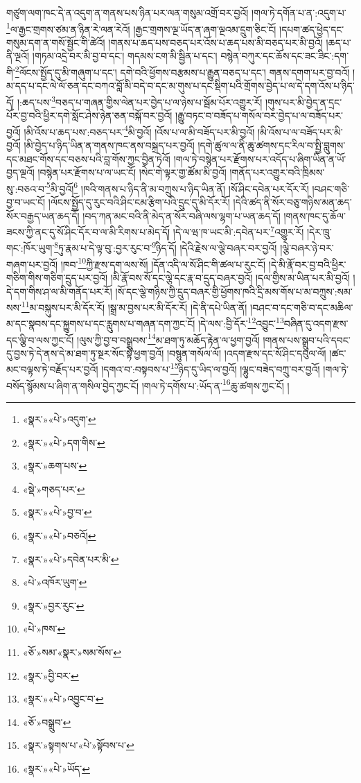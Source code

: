 གཙུག་ལག་ཁང་དེ་ན་འདུག་ན་གནས་པས་ཉིན་པར་ལན་གསུམ་འགྲོ་བར་བྱའོ། །གལ་ཏེ་དགོན་པ་ན་:འདུག་པ་\footnote{«སྣར་»«པེ་»འདུག་}ལ་རྒྱང་གྲགས་ཙམ་ན་ཉིན་རེ་ལན་རེའོ། །རྒྱང་གྲགས་ལྔ་ཡོད་ན་ཞག་ལྔའམ་དྲུག་ཅིང་ངོ། །དཔག་ཚད་ཕྱེད་དང་གསུམ་དག་ན་གསོ་སྦྱོང་གི་ཚེའོ། །གནས་པ་ཆད་པས་བཅད་པར་འོས་པ་ཆད་པས་མི་བཅད་པར་མི་བྱའོ། །ཆད་པ་ནི་ལྔའོ། །གཏམ་འདྲེ་བར་མི་བྱ་བ་དང་། གདམས་ངག་མི་སྦྱིན་པ་དང་། བསྙེན་བཀུར་དང་ཆོས་དང་ཟང་ཟིང་:དག་གི་\footnote{«སྣར་»«པེ་»དག་གིས་}ལོངས་སྤྱོད་དུ་མི་གཞུག་པ་དང་། དགེ་བའི་ཕྱོགས་བརྩམས་པ་རྒྱུན་བཅད་པ་དང་། གནས་དགག་པར་བྱ་བའོ། །མ་དད་པ་དང་ལེ་ལོ་ཅན་དང་བཀའ་བློ་མི་བདེ་བ་དང་མ་གུས་པ་དང་སྡིག་པའི་གྲོགས་བྱེད་པ་ལ་དེ་དག་འོས་པ་ཉིད་དོ། །:ཆད་པས་\footnote{«སྣར་»ཆག་པས་}བཅད་པ་གཞན་གྱིས་ལེན་པར་བྱེད་པ་ལ་ཉེས་པ་སྦོམ་པོར་འགྱུར་རོ། །གུས་པར་མི་བྱེད་ན་དྲང་པོར་བྱ་བའི་ཕྱིར་དགེ་སློང་ཤེས་ཉེན་ཅན་བསྐོ་བར་བྱའོ། །རྒྱུ་བཏང་བ་བཟོད་པ་གསོལ་བར་བྱེད་པ་ལ་བཟོད་པར་བྱའོ། །མི་འོས་པ་ཆད་པས་:བཅད་པར་\footnote{«སྡེ་»གཅད་པར་}མི་བྱའོ། །འོས་པ་ལ་མི་བཟོད་པར་མི་བྱའོ། །མི་འོས་པ་ལ་བཟོད་པར་མི་བྱའོ། །མི་བྱེད་པ་ཉིད་ཡིན་ན་གནས་ཁང་ནས་བསྐྲད་པར་བྱའོ། །དགེ་ཚུལ་ལ་ནི་ཆུ་ཚགས་དང་རིལ་བ་སྤྱི་བླུགས་དང་མཐང་གོས་དང་བཅས་པའི་བླ་གོས་ཀྱང་བྱིན་ཏེའོ། །གལ་ཏེ་བསྙེན་པར་རྫོགས་པར་འདོད་པ་ཞིག་ཡིན་ན་ཡོ་བྱད་ལྔའོ། །བསྙེན་པར་རྫོགས་པ་ལ་ཡང་ངོ། །སེང་གེ་ལྟར་གྱ་ཚོམ་མི་བྱའོ། །གནོད་པར་འགྱུར་བའི་ཁྲིམས་སུ་:བཅའ་བ་\footnote{«སྣར་»«པེ་»བྱ་བ་}མི་བྱའོ།\footnote{«སྣར་»«པེ་»བཅའོ།} །ཁའི་གནས་པ་ཉིད་ནི་མ་བཀྲུས་པ་ཉིད་ཡིན་ནོ། །སོ་ཤིང་དབེན་པར་དོར་རོ། །བཤང་གཅི་བྱ་བ་ཡང་ངོ། །ལོངས་སྤྱོད་དུ་རུང་བའི་ཤིང་ངམ་རྩིག་པའི་དྲུང་དུ་མི་དོར་རོ། །དེའི་ཚད་ནི་སོར་བཅུ་གཉིས་མན་ཆད་སོར་བརྒྱད་ཡན་ཆད་དོ། །བད་ཀན་མང་བའི་ནི་མེད་ན་སོར་བཞི་ལས་ལྷག་པ་ཡན་ཆད་དོ། །གནས་ཁང་དུ་ཆོལ་ཟངས་ཀྱི་ནང་དུ་སོ་ཤིང་དོར་བ་ལ་མི་རིགས་པ་མེད་དོ། །དེ་ལ་ཝ་ཁ་ཡང་མི་:དབེན་པར་\footnote{«སྣར་»«པེ་»དབེན་པར་མི་}འགྱུར་རོ། །དེར་ཁྲུ་གང་:ཁོར་ཡུག་\footnote{«པེ་»འཁོར་ཡུག་}ཏུ་རྣམ་པ་དེ་ལྟ་བུ་:བྱར་རུང་བ་\footnote{«སྣར་»བྱར་རུང་}ཉིད་དོ། །དེའི་རྗེས་ལ་ལྕེ་བཞར་བར་བྱའོ། །ལྕེ་བཞར་ཉེ་བར་གཞག་པར་བྱའོ། །ཁབ་\footnote{«པེ་»ཁས་}ཀྱི་རྫས་དག་ལས་སོ། །དོན་འདི་ལ་སོ་ཤིང་གི་ཚལ་པ་རུང་ངོ། །དེ་མི་རྣོ་བར་བྱ་བའི་ཕྱིར་གཅིག་གིས་གཅིག་དྲུད་པར་བྱའོ། །མི་རྣོ་བས་སོ་དང་ལྕེ་དང་རྣ་བ་དྲུད་བཞར་བྱའོ། །དལ་གྱིས་མ་ཡིན་པར་མི་བྱའོ། །དེ་དག་གིས་ཤ་ལ་མི་གནོད་པར་རོ། །སོ་དང་ལྕེ་གཉིས་ཀྱི་དྲུད་བཞར་གྱི་ཕྱོགས་ཁའི་དྲི་མས་གོས་པ་མ་བཀྲུས་:སམ་སས་\footnote{«ཅོ་»སམ་«སྣར་»སམ་སོས་}མ་བསྐུས་པར་མི་དོར་རོ། །སྒྲ་མ་བྱས་པར་མི་དོར་རོ། །དེ་ནི་དཔེ་ཡིན་ནོ། །བཤང་བ་དང་གཅི་བ་དང་མཆིལ་མ་དང་སྣབས་དང་སྐྱུགས་པ་དང་རླུགས་པ་གཞན་དག་ཀྱང་ངོ། །དེ་ལས་:བྱི་དོར་\footnote{«སྣར་»བྱི་བར་}འབྱུང་\footnote{«སྣར་»«པེ་»འབྱུང་བ་}བཞིན་དུ་འདག་རྫས་དང་ལྕི་བ་ལས་ཀྱང་ངོ། །ལུས་ཀྱི་བྱ་བ་བསྒྲུབས་\footnote{«ཅོ་»བསྒྲུབ་}མ་ཐག་ཏུ་མཆོད་རྟེན་ལ་ཕྱག་བྱའོ། །གནས་པས་སྒྲུབ་པའི་དབང་དུ་བྱས་ཏེ་དེ་ནས་དེ་མ་ཐག་ཏུ་སྔར་སོང་སྟེ་ཕྱག་བྱའོ། །བསྙུན་གསོལ་ལོ། །འདག་རྫས་དང་སོ་ཤིང་དབུལ་ལོ། །ཚང་མང་བལྟས་ཏེ་བརྗོད་པར་བྱའོ། །དགའ་བ་:བསྟབས་པ་\footnote{«སྣར་»སྟགས་པ་«པེ་»སྟོབས་པ་}ཉིད་དུ་ཡིད་ལ་བྱའོ། །ལྷུང་བཟེད་བཀྲུ་བར་བྱའོ། །གལ་ཏེ་བསོད་སྙོམས་པ་ཞིག་ན་གསིལ་བྱེད་ཀྱང་ངོ། །གལ་ཏེ་དགོས་པ་:ཡོད་ན་\footnote{«སྣར་»«པེ་»ཡོད་}ཆུ་ཚགས་ཀྱང་ངོ། །
